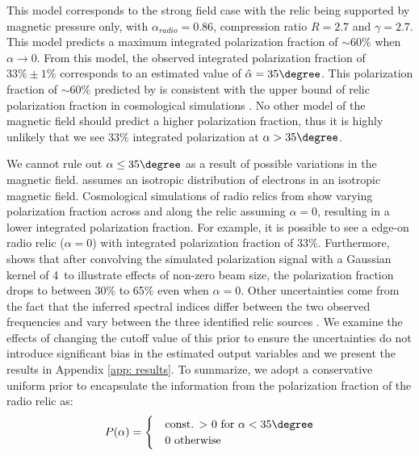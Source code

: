 This model corresponds to the strong field case with the relic being supported by
magnetic pressure only, with $\alpha_{radio} = 0.86$, compression ratio
$R=2.7$ and $\gamma = 2.7$. 
This model predicts a maximum integrated polarization fraction of
$\sim60\%$ when $\alpha \rightarrow 0$. From this model, the observed integrated
polarization fraction of $33\%\pm1\%$ corresponds to an estimated value
of $\hat{\alpha}
 = 35\degree$. 
This  polarization fraction of $\sim 60\%$ predicted by \citep{E98} is
consistent with the upper bound of relic polarization fraction in cosmological
simulations \citep{S13}. No other model of the magnetic field should predict a higher polarization fraction, thus it is highly unlikely that we see 33\%
integrated polarization at $\alpha > 35\degree$.  
\par

We cannot rule out $\alpha \leq 35\degree$ as a result of possible
variations in the magnetic field. 
\cite{E98} assumes an isotropic distribution of electrons in an isotropic magnetic field. Cosmological
simulations of radio relics from \cite{S13} show varying polarization
fraction across and along the relic assuming $\alpha = 0$, resulting in a
lower integrated polarization fraction. For example, it is possible to see a edge-on radio relic ($\alpha = 0$) with integrated polarization fraction of 33\%. 
Furthermore, \cite{S13} shows that after convolving the
simulated polarization signal with a Gaussian kernel of 4\arcmin~to
illustrate effects of non-zero beam size, the polarization fraction drops to between 30\% to
65\% even when $\alpha = 0$. 
Other uncertainties come from the fact that the inferred spectral indices
differ between the two observed frequencies and vary between the three
identified relic sources \citep{L13}. We examine the effects  of changing
the cutoff value of this prior to ensure the uncertainties do not
introduce significant bias in the estimated output variables and we
present the results in Appendix \ref{app: results}.
To summarize, we adopt a conservative uniform prior to encapsulate the
information from the polarization fraction of the radio relic as:
\begin{equation}
P(\alpha) = 
	\begin{cases}
	& \text{const. $>$ 0 for  }\alpha < 35 \degree \\ 
	& 0 \text{ otherwise}
	\end{cases}
\end{equation}

